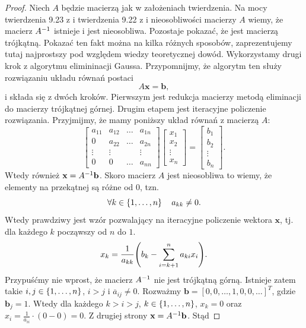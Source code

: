 \documentclass[12pt,a4paper]{report}
\newcommand{\vr}[1]{\mathbf{#1}}
\newcommand{\mx}[1]{{#1}}
\begin{document}
\begin{proof}
Niech $\mx{A}$ będzie macierzą jak w założeniach twierdzenia.
Na mocy twierdzenia 9.23 z \citep{poreda11} i twierdzenia 9.22 z \citep{poreda11} i nieosobliwości macierzy $\mx{A}$ wiemy, że macierz $\inverse{\mx{A}} $ istnieje i jest nieosobliwa. Pozostaje pokazać, że jest macierzą trójkątną. Pokazać ten fakt można na kilka różnych sposobów, zaprezentujemy tutaj najprostszy pod względem wiedzy teoretycznej dowód.
Wykorzystamy drugi krok z algorytmu elimininacji Gaussa. Przypomnijmy, że algorytm ten służy rozwiązaniu układu równań postaci 
$$
\mx{A} \vr{x} = \vr{b},
$$
i składa się z dwóch kroków. Pierwszym jest redukcja macierzy metodą eliminacji do macierzy trójkątnej górnej. Drugim etapem jest iteracyjne policzenie rozwiązania. Przyjmijmy, że mamy poniższy układ równań z macierzą $\mx{A}$:
$$
\begin{bmatrix}
a_{11} & a_{12} & \ldots & a_{1n} \\
0 & a_{22} & \ldots & a_{2n} \\
\vdots & \vdots & & \vdots\\
0 & 0 & \ldots & a_{nn}
\end{bmatrix}
\begin{bmatrix}
x_1 \\ x_2 \\ \vdots \\ x_n
\end{bmatrix}
=
\begin{bmatrix}
b_1 \\ b_2 \\ \vdots \\ b_n
\end{bmatrix}.
$$
Wtedy również $\vr{x} = \inverse{\mx{A}}\vr{b}$. Skoro macierz $\mx{A}$ jest nieosobliwa to wiemy, że elementy na przekątnej są różne od $0$, tzn.
$$
\forall k \in \left\lbrace {1, \ldots, n} \right\rbrace \quad a_{kk} \neq 0.
$$
Wtedy prawdziwy jest wzór pozwalający na iteracyjne policzenie wektora $\vr{x}$, tj. dla każdego $k$ począwszy od $n$ do $1$.
\begin{equation}
x_k = \frac{1}{a_{kk}} \bracket{b_k - \sum_{i=k+1}^{n} a_{ki} x_{i}}.
\end{equation}
Przypuśćmy nie wprost, że macierz $\inverse{\mx{A}}$ nie jest trójkątną górną. Istnieje zatem takie $i,j \in \left\lbrace {1, \ldots, n} \right\rbrace$, $i > j$ i $\overline{a}_{ij} \neq 0 $. Rozważmy $\vr{b}= [0,0, \ldots, 1,0,0, \ldots]^{T}$, gdzie $\vr{b}_{j} = 1$. Wtedy dla każdego $k>i>j$, $k \in \left\lbrace {1, \ldots, n} \right\rbrace$, $x_{k} = 0$ oraz $x_{i} = \frac{1}{a_{ii}} \cdot(0 - 0 ) = 0$. Z drugiej strony $\vr{x} = \inverse{\mx{A}} \vr{b}$. Stąd 

\end{proof}
\end{document}
